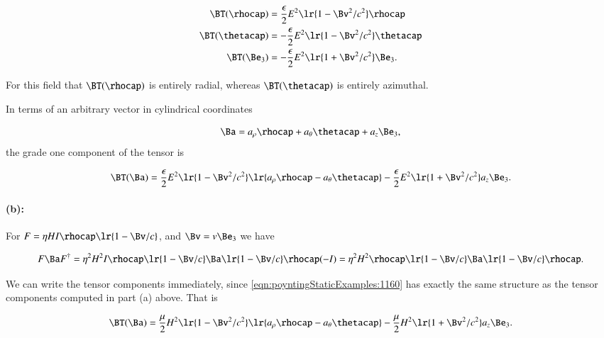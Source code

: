 \begin{dmath}\label{eqn:poyntingStaticExamples:1080}
\begin{aligned}
\BT(\rhocap) &= \frac{\epsilon}{2} E^2 \lr{1 -\Bv^2/c^2} \rhocap \\
\BT(\thetacap) &= -\frac{\epsilon}{2} E^2 \lr{1 -\Bv^2/c^2} \thetacap \\
\BT(\Be_3) &= -\frac{\epsilon}{2} E^2 \lr{1 + \Bv^2/c^2 } \Be_3.
\end{aligned}
\end{dmath}

For this field that \( \BT(\rhocap) \) is entirely radial, whereas \( \BT(\thetacap) \) is entirely azimuthal.

In terms of an arbitrary vector in cylindrical coordinates

\begin{dmath}\label{eqn:poyntingStaticExamples:1200}
\Ba = a_\rho \rhocap + a_\theta \thetacap + a_z \Be_3,
\end{dmath}
the grade one component of the tensor is

\begin{dmath}\label{eqn:poyntingStaticExamples:1140}
\BT(\Ba) =
\frac{\epsilon}{2} E^2 \lr{1 -\Bv^2/c^2} \lr{ a_\rho \rhocap - a_\theta \thetacap }
-\frac{\epsilon}{2} E^2 \lr{1 +\Bv^2/c^2} a_z \Be_3.
\end{dmath}

\paragraph{(b):}

For \( F = \eta H I \rhocap \lr{ 1 - \Bv/c } \), and \( \Bv = v \Be_3 \) we have

\begin{dmath}\label{eqn:poyntingStaticExamples:1160}
F \Ba F^\dagger
=
\eta^2 H^2 I \rhocap \lr{ 1 - \Bv/c } \Ba \lr{ 1 - \Bv/c } \rhocap (-I)
=
\eta^2 H^2 \rhocap \lr{ 1 - \Bv/c } \Ba \lr{ 1 - \Bv/c } \rhocap.
\end{dmath}

We can write the tensor components immediately, since
\cref{eqn:poyntingStaticExamples:1160}
has exactly the same structure as the tensor components computed in part (a) above.  That is

\begin{dmath}\label{eqn:poyntingStaticExamples:1180}
\BT(\Ba) =
\frac{\mu}{2} H^2 \lr{1 -\Bv^2/c^2} \lr{ a_\rho \rhocap - a_\theta \thetacap }
-\frac{\mu}{2} H^2 \lr{1 +\Bv^2/c^2} a_z \Be_3.
\end{dmath}

